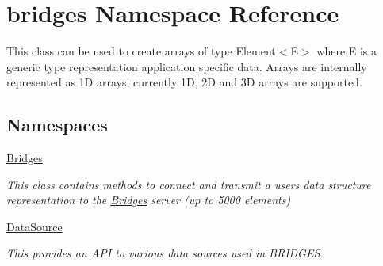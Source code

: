 \hypertarget{namespacebridges}{}\section{bridges Namespace Reference}
\label{namespacebridges}


This class can be used to create arrays of type Element$<$\+E$>$ where E is a generic type representation application specific data. Arrays are internally represented as 1D arrays; currently 1D, 2D and 3D arrays are supported.  


\subsection*{Namespaces}
\begin{DoxyCompactItemize}
\item 
 \mbox{\hyperlink{namespacebridges_1_1_bridges}{Bridges}}
\begin{DoxyCompactList}\small\item\em This class contains methods to connect and transmit a user\textquotesingle{}s data structure representation to the \mbox{\hyperlink{namespacebridges_1_1_bridges}{Bridges}} server (up to 5000 elements) \end{DoxyCompactList}\item 
 \mbox{\hyperlink{namespacebridges_1_1_data_source}{Data\+Source}}
\begin{DoxyCompactList}\small\item\em This provides an A\+PI to various data sources used in B\+R\+I\+D\+G\+ES. \end{DoxyCompactList}\end{DoxyCompactItemize}

